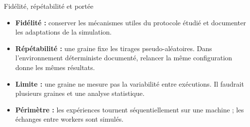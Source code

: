 \begin{frame}{Fidélité, répétabilité et portée}
    \small
    \begin{itemize}
        \item \textbf{Fidélité :} conserver les mécanismes utiles du protocole
        étudié et documenter les adaptations de la simulation.
        \item \textbf{Répétabilité :} une graine fixe les tirages pseudo-aléatoires.
        Dans l'environnement déterministe documenté, relancer la même
        configuration donne les mêmes résultats.
        \item \textbf{Limite :} une graine ne mesure pas la variabilité entre
        exécutions. Il faudrait plusieurs graines et une analyse statistique.
        \item \textbf{Périmètre :} les expériences tournent séquentiellement sur
        une machine ; les échanges entre workers sont simulés.
    \end{itemize}
\end{frame}

